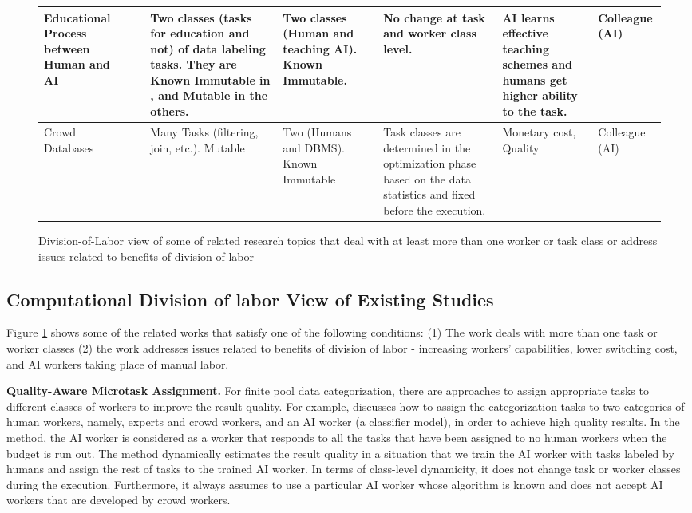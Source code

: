 \begin{figure}
\begin{tabular}{|p{15mm}|p{10mm}|p{24mm}|p{24mm}|p{35mm}|p{24mm}|p{13mm}|}
\hline
Educational Process between Human and AI & \cite{YXG18,LDH+17,FZL+12,JAB15} & Two classes (tasks for education and not) of data labeling tasks. They are Known Immutable in \cite{JAB15}, and Mutable in the others. & Two classes (Human and teaching AI). 
Known Immutable. & No change at task and worker class level. & AI learns effective teaching schemes and humans get higher ability to the task. & Colleague (AI)\\
\hline
Crowd Databases &\cite{FKK+11, PPG+12}& Many Tasks (filtering, join, etc.). Mutable & Two (Humans and DBMS). Known Immutable & Task classes are determined in the optimization phase based on the data statistics and fixed before the execution.
& Monetary cost,  
Quality&Colleague (AI)\\
\hline
\end{tabular}
    \caption{Division-of-Labor view of some of  related  research topics that deal with at least more than one worker  or task class or address issues related to benefits of division of labor}
    \label{fig:relatedwork}
\end{figure}


\subsection{Computational Division of labor View of Existing Studies}

Figure \ref{fig:relatedwork} shows some of the related works that satisfy one of the following conditions: (1) The work deals with more than one task or worker classes (2) the work addresses issues related to benefits of division of labor - increasing workers' capabilities, lower switching cost, and AI workers taking place of manual labor.

\noindent
{\bf Quality-Aware Microtask Assignment.}
For finite pool data categorization, there are approaches to assign appropriate tasks to different classes of workers to  improve the result quality. 
For example, \cite{NWL15} discusses how to assign the categorization tasks to  two categories of human workers, namely, experts and crowd workers, and an AI worker (a classifier model), in order to achieve high quality results. 
In the method, the AI worker is considered as a worker that responds to all the tasks that have been assigned to no human workers when the budget is run out.
The method dynamically estimates the result quality in a situation that we train the AI worker with tasks labeled by humans and assign the rest of tasks to the trained AI worker.
In terms of class-level dynamicity, it does not change task or worker classes during the execution. Furthermore, it always assumes to use a particular AI worker whose algorithm is known and does not accept AI workers that are developed by crowd workers.

